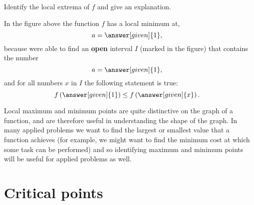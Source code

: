 \documentclass{ximera}
\begin{document}
\begin{example}
\begin{image}
\begin{tikzpicture}
\end{tikzpicture}
\end{image}
Identify the local extrema of $f$ and give an explanation.
\begin{explanation}
In the figure above the function $f$ has a local minimum at,
\[
a=\answer[given]{1},
\]
because were able to find an \textbf{open} interval $I$ (marked in the
figure) that contains the number
\[
a=\answer[given]{1},
\]
and for all numbers $x$ in $I$ the following statement is true:
 \[
f\left(\answer[given]{1}\right)\le f\left(\answer[given]{x}\right).
\]
\end{explanation}
\end{example}

Local maximum and minimum points are quite distinctive on the graph of
a function, and are therefore useful in understanding the shape of the
graph. In many applied problems we want to find the largest or
smallest value that a function achieves (for example, we might want
to find the minimum cost at which some task can be performed) and so
identifying maximum and minimum points will be useful for applied
problems as well.



\section{Critical points}
\end{document}
